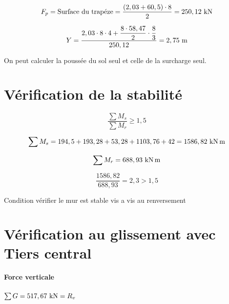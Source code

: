 \documentclass[12pt,a4paper]{article}
\begin{document}
	
	\begin{center}
	\end{center}
	
	
	\[ F_{p} = \text{Surface du trapéze} = \dfrac{(2,03 + 60,5) \cdot 8}{2} = 250,12\kn \]
	
	\[ Y = \dfrac{2,03 \cdot 8 \cdot 4 + \dfrac{8 \cdot 58,47}{2} \cdot \dfrac{8}{3}}{250,12} = 2,75\meterl \]
	
	\begin{tcolorbox}[colback=gray!20, colframe=black, title=Remarque]
		On peut calculer la poussée du sol seul et celle de la surcharge seul.
	\end{tcolorbox}
	
	
	\section{Vérification de la stabilité}
	
	\[ \dfrac{\sum M_{s}}{\sum M_{r}} \geq 1,5 \]
	
	\[ \sum M_{s} = 194,5 + 193,28 + 53,28 + 1103,76 + 42  =  1586,82\knxm \]
	
	\[ \sum M_{r} = 688,93\knxm \]
	
	\[ \dfrac{1586,82}{688,93} = 2,3 > 1,5 \] 
	
	{\centering Condition vérifier le mur est stable vis a vis au renversement \par}
	
	\section{Vérification au glissement avec Tiers central}
	
	\paragraph{Force verticale} $\sum G = 517,67\kn = R_{v}$
	
\end{document}
